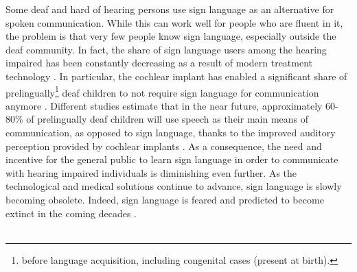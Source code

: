 \documentclass[english, 12pt, a4paper, pdftex, elec, utf8]{aaltothesis}
\begin{document}
Some deaf and hard of hearing persons use sign language as an alternative for spoken communication. While this can work well for people who are fluent in it, the problem is that very few people know sign language, especially outside the deaf community. In fact, the share of sign language users among the hearing impaired has been constantly decreasing as a result of modern treatment technology \cite{stacey2006hearing, raino2012sisakorvaistutteen}. In particular, the cochlear implant has enabled a significant share of prelingually\footnote{before language acquisition, including congenital cases (present at birth).} deaf children to not require sign language for communication anymore \cite{moore2007cochlear, peterson2010cochlear}. Different studies estimate that in the near future, approximately 60-80\% of prelingually deaf children will use speech as their main means of communication, as opposed to sign language, thanks to the improved auditory perception provided by cochlear implants \cite{raino2012sisakorvaistutteen}. As a consequence, the need and incentive for the general public to learn sign language in order to communicate with hearing impaired individuals is diminishing even further. As the technological and medical solutions continue to advance, sign language is slowly becoming obsolete. Indeed, sign language is feared and predicted to become extinct in the coming decades \cite{raino2012sisakorvaistutteen}. \\\\
\end{document}
